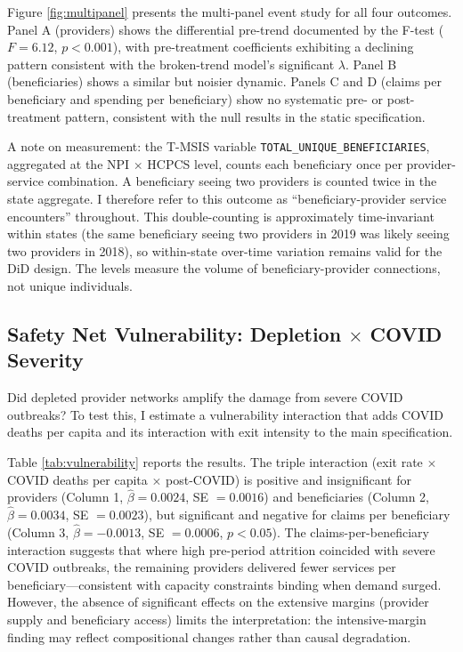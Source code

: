 \documentclass[12pt]{article}
\begin{document}
Figure \ref{fig:multipanel} presents the multi-panel event study for all four outcomes. Panel A (providers) shows the differential pre-trend documented by the F-test ($F = 6.12$, $p < 0.001$), with pre-treatment coefficients exhibiting a declining pattern consistent with the broken-trend model's significant $\lambda$. Panel B (beneficiaries) shows a similar but noisier dynamic. Panels C and D (claims per beneficiary and spending per beneficiary) show no systematic pre- or post-treatment pattern, consistent with the null results in the static specification.

A note on measurement: the T-MSIS variable \texttt{TOTAL\_UNIQUE\_BENEFICIARIES}, aggregated at the NPI $\times$ HCPCS level, counts each beneficiary once per provider-service combination. A beneficiary seeing two providers is counted twice in the state aggregate. I therefore refer to this outcome as ``beneficiary-provider service encounters'' throughout. This double-counting is approximately time-invariant within states (the same beneficiary seeing two providers in 2019 was likely seeing two providers in 2018), so within-state over-time variation remains valid for the DiD design. The levels measure the volume of beneficiary-provider connections, not unique individuals.

\subsection{Safety Net Vulnerability: Depletion $\times$ COVID Severity}

Did depleted provider networks amplify the damage from severe COVID outbreaks? To test this, I estimate a vulnerability interaction that adds COVID deaths per capita and its interaction with exit intensity to the main specification.



Table \ref{tab:vulnerability} reports the results. The triple interaction (exit rate $\times$ COVID deaths per capita $\times$ post-COVID) is positive and insignificant for providers (Column 1, $\hat{\beta} = 0.0024$, SE $= 0.0016$) and beneficiaries (Column 2, $\hat{\beta} = 0.0034$, SE $= 0.0023$), but significant and negative for claims per beneficiary (Column 3, $\hat{\beta} = -0.0013$, SE $= 0.0006$, $p < 0.05$). The claims-per-beneficiary interaction suggests that where high pre-period attrition coincided with severe COVID outbreaks, the remaining providers delivered fewer services per beneficiary---consistent with capacity constraints binding when demand surged. However, the absence of significant effects on the extensive margins (provider supply and beneficiary access) limits the interpretation: the intensive-margin finding may reflect compositional changes rather than causal degradation.
\end{document}
